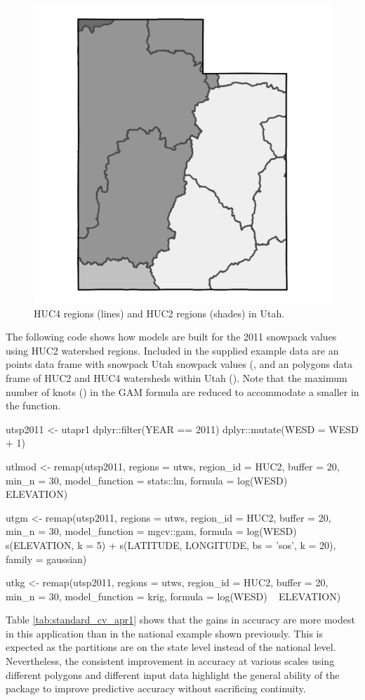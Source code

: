 \begin{figure}[htbp]
    \centering
    \includegraphics[width=.46\textwidth]{figures/utah_regions.png}
    \caption{HUC4 regions (lines) and HUC2 regions (shades) in Utah.}
    \label{fig:utah_regions}
\end{figure}


The following code shows how  models are built for the 2011 snowpack values using HUC2 watershed regions. Included in the supplied example data are an  points data frame with snowpack Utah snowpack values (, and an  polygons data frame of HUC2 and HUC4 watersheds within Utah (). Note that the maximum number of knots () in the GAM formula are reduced to accommodate a smaller  in the  function.

\begin{example}
utsp2011 <- utapr1 %
  dplyr::filter(YEAR == 2011) %
  dplyr::mutate(WESD = WESD + 1)

utlmod <- remap(utsp2011, 
                regions = utws, region_id = HUC2,
                buffer = 20, min_n = 30,
                model_function = stats::lm,
                formula = log(WESD) ~ ELEVATION)
                
utgm <- remap(utsp2011, 
              regions = utws, region_id = HUC2,
              buffer = 20, min_n = 30,
              model_function = mgcv::gam,
              formula = log(WESD) ~ s(ELEVATION, k = 5) +
                s(LATITUDE, LONGITUDE, bs = 'sos', k = 20),
              family = gaussian)
              
utkg <- remap(utsp2011, 
              regions = utws, region_id = HUC2,
              buffer = 20, min_n = 30,
              model_function = krig,
              formula = log(WESD) ~ ELEVATION)
\end{example}

Table \ref{tab:standard_cv_apr1} shows that the gains in accuracy are more modest in this application than in the national example shown previously. This is expected as the partitions are on the state level instead of the national level. Nevertheless, the consistent improvement in accuracy at various scales using different polygons and different input data highlight the general ability of the  package to improve predictive accuracy without sacrificing continuity. 

